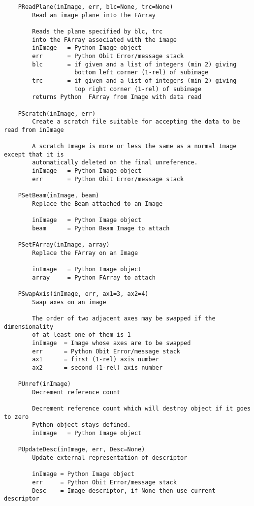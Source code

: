 \documentclass[11pt]{report}
\begin{document}
\begin{verbatim}
    PReadPlane(inImage, err, blc=None, trc=None)
        Read an image plane into the FArray 
        
        Reads the plane specified by blc, trc
        into the FArray associated with the image
        inImage   = Python Image object
        err       = Python Obit Error/message stack
        blc       = if given and a list of integers (min 2) giving
                    bottom left corner (1-rel) of subimage
        trc       = if given and a list of integers (min 2) giving
                    top right corner (1-rel) of subimage
        returns Python  FArray from Image with data read
    
    PScratch(inImage, err)
        Create a scratch file suitable for accepting the data to be read from inImage
        
        A scratch Image is more or less the same as a normal Image except that it is
        automatically deleted on the final unreference.
        inImage   = Python Image object
        err       = Python Obit Error/message stack
    
    PSetBeam(inImage, beam)
        Replace the Beam attached to an Image
        
        inImage   = Python Image object
        beam      = Python Beam Image to attach
    
    PSetFArray(inImage, array)
        Replace the FArray on an Image
        
        inImage   = Python Image object
        array     = Python FArray to attach
    
    PSwapAxis(inImage, err, ax1=3, ax2=4)
        Swap axes on an image
        
        The order of two adjacent axes may be swapped if the dimensionality
        of at least one of them is 1
        inImage  = Image whose axes are to be swapped
        err      = Python Obit Error/message stack
        ax1      = first (1-rel) axis number
        ax2      = second (1-rel) axis number
    
    PUnref(inImage)
        Decrement reference count
        
        Decrement reference count which will destroy object if it goes to zero
        Python object stays defined.
        inImage   = Python Image object
    
    PUpdateDesc(inImage, err, Desc=None)
        Update external representation of descriptor
        
        inImage = Python Image object
        err     = Python Obit Error/message stack
        Desc    = Image descriptor, if None then use current descriptor
    

\end{verbatim}
\end{document}
